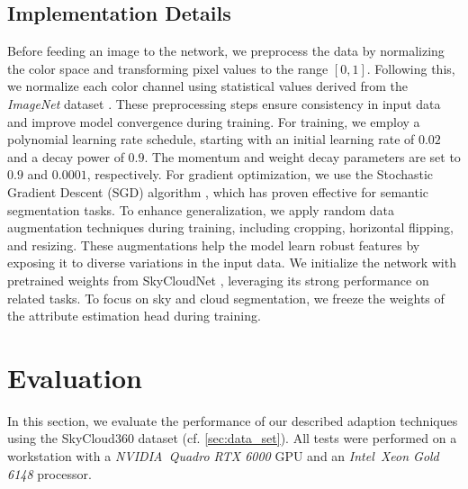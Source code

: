 \documentclass[conference]{IEEEtran}
\begin{document}



\subsection{Implementation Details} \label{sec:training}
Before feeding an image to the network, we preprocess the data by normalizing the color space and transforming pixel values to the range \([0, 1]\). Following this, we normalize each color channel using statistical values derived from the \textit{ImageNet} dataset \cite{imagenet}. These preprocessing steps ensure consistency in input data and improve model convergence during training.
For training, we employ a polynomial learning rate schedule, starting with an initial learning rate of \(0.02\) and a decay power of \(0.9\). The momentum and weight decay parameters are set to \(0.9\) and \(0.0001\), respectively. For gradient optimization, we use the Stochastic Gradient Descent (SGD) algorithm \cite{sgd}, which has proven effective for semantic segmentation tasks.
To enhance generalization, we apply random data augmentation techniques during training, including cropping, horizontal flipping, and resizing. These augmentations help the model learn robust features by exposing it to diverse variations in the input data.
We initialize the network with pretrained weights from SkyCloudNet \cite{gerhardt2023skycloud}, leveraging its strong performance on related tasks. To focus on sky and cloud segmentation, we freeze the weights of the attribute estimation head during training.
\section{Evaluation}\label{sec:eval}
In this section, we evaluate the performance of our described adaption techniques using the SkyCloud360 dataset (cf. \cref{sec:data_set}).
All tests were performed on a workstation with a \textit{NVIDIA\textregistered\ Quadro RTX 6000} GPU and an \textit{Intel\textregistered\ Xeon Gold 6148} processor. 

\end{document}
